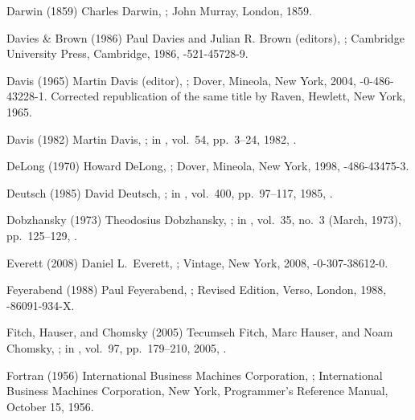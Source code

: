 \biblabel Darwin (1859)
Charles Darwin,
;
John Murray, London, 1859.

\biblabel Davies \& Brown (1986)
Paul Davies and Julian R. Brown (editors),
;
Cambridge University Press, Cambridge, 1986,
-521-45728-9.

\biblabel Davis (1965)
Martin Davis (editor),
;
Dover, Mineola, New York, 2004,
-0-486-43228-1.
Corrected republication of the same title
by Raven, Hewlett, New York, 1965.

\biblabel Davis (1982)
Martin Davis,
;
in ,
vol.\ 54, pp.\ 3--24, 1982,
.

\biblabel DeLong (1970)
Howard DeLong,
;
Dover, Mineola, New York, 1998,
-486-43475-3.

\biblabel Deutsch (1985)
David Deutsch,
;
in ,
 vol.\ 400, pp.\ 97--117, 1985,
.

\biblabel Dobzhansky (1973)
Theodosius Dobzhansky,
;
in ,
 vol.\ 35, no.\ 3 (March, 1973), pp.\ 125--129,
.

\biblabel Everett (2008)
Daniel L.\ Everett,
;
Vintage, New York, 2008,
-0-307-38612-0.

\biblabel Feyerabend (1988)
Paul Feyerabend,
;
Revised Edition, Verso, London, 1988,
-86091-934-X.

\biblabel  Fitch, Hauser, and Chomsky (2005)
Tecumseh Fitch, Marc Hauser, and Noam Chomsky,
;
in ,
vol.\ 97, pp.\ 179--210, 2005,
.

\biblabel Fortran (1956)
International Business Machines Corporation,
;
International Business Machines Corporation, New York,
Programmer's Reference Manual, October 15, 1956.

